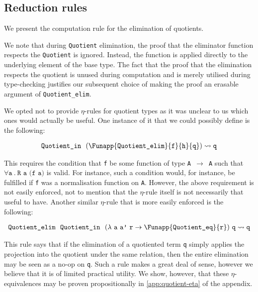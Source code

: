\documentclass[12pt,twoside,maitrise]{dms}
\theoremstyle{definition}
\numberwithin{equation}{section}
\numberwithin{table}{chapter}
\numberwithin{figure}{chapter}
\newcommand\id[1] {\texttt{#1}}
\newcommand\fn[1] {\texttt{#1}}
\begin{document}
\subsection{Reduction rules}\label{quot-red-rules}
We present the computation rule for the elimination of quotients.

\begin{prooftree*}
   \infer0{\id{Quotient\_elim} \ \ \id{f} \ \ \id{p}
     \ \ (\id{Quotient\_in} \ \ \id{R} \ \ \id{a}) \leadsto
     \Funapp{\id{f}}{\id{a}}}
\end{prooftree*}

We note that during \id{Quotient} elimination, the proof that the eliminator
function respects the \id{Quotient} is ignored. Instead, the function is applied
directly to the underlying element of the base type. The fact that the proof
that the elimination respects the quotient is unused during computation and is
merely utilised during type-checking justifies our subsequent choice of making
the proof an erasable argument of \id{Quotient\_elim}.

We opted not to provide $\eta$-rules for quotient types as it was unclear to us
which ones would actually be useful. One instance of it that we could possibly
define is the following:

\begin{align*}
  & \id{Quotient\_in} \ \ (\Funapp{\fn{Quotient\_elim}}{\id{f}}{\id{h}}{\id{q}}) \leadsto{} \id{q} \\
\end{align*}

This requires the condition that \id{f} be some function of type \fn{A
  $\rightarrow$ A} such that $\forall \id{a} \ . \ \fn{R a (f a)}$ is valid. For
instance, such a condition would, for instance, be fulfilled if \id{f} was a
normalisation function on \id{A}. However, the above requirement is not easily
enforced, not to mention that the $\eta$-rule itself is not necessarily that
useful to have. Another similar $\eta$-rule that is more easily enforced is the
following:

\begin{align*}
  & \fn{Quotient\_elim} \ \  \id{Quotient\_in} \ \ (\lambda \ \id{a} \ \id{a'} \ \id{r} \rightarrow \Funapp{\id{Quotient\_eq}}{\id{r}}) \ \id{q} \leadsto{} \id{q} \\
\end{align*}

This rule says that if the elimination of a quotiented term \id{q} simply
applies the projection into the quotient under the same relation, then the
entire elimination may be seen as a no-op on \id{q}. Such a rule makes a great
deal of sense, however we believe that it is of limited practical utility. We
show, however, that these $\eta$-equivalences may be proven propositionally in
\autoref{app:quotient-eta} of the appendix.
\end{document}
